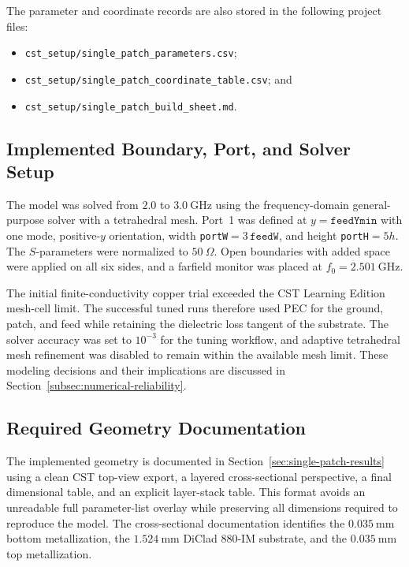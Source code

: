 The parameter and coordinate records are also stored in the following project files:
\begin{itemize}
    \item \nolinkurl{cst_setup/single_patch_parameters.csv};
    \item \nolinkurl{cst_setup/single_patch_coordinate_table.csv}; and
    \item \nolinkurl{cst_setup/single_patch_build_sheet.md}.
\end{itemize}

\subsection{Implemented Boundary, Port, and Solver Setup}
\label{subsec:cst-single-patch-solver-setup}

The model was solved from $2.0$ to $3.0~\mathrm{GHz}$ using the frequency-domain general-purpose
solver with a tetrahedral mesh. Port~1 was defined at $y=\texttt{feedYmin}$ with one mode, positive-$y$
orientation, width \texttt{portW}$=3\,\texttt{feedW}$, and height \texttt{portH}$=5h$. The
$S$-parameters were normalized to $50~\Omega$. Open boundaries with added space were applied on all
six sides, and a farfield monitor was placed at $f_0=2.501~\mathrm{GHz}$.

The initial finite-conductivity copper trial exceeded the CST Learning Edition mesh-cell limit. The
successful tuned runs therefore used PEC for the ground, patch, and feed while retaining the dielectric
loss tangent of the substrate. The solver accuracy was set to $10^{-3}$ for the tuning workflow, and
adaptive tetrahedral mesh refinement was disabled to remain within the available mesh limit. These
modeling decisions and their implications are discussed in Section~\ref{subsec:numerical-reliability}.

\subsection{Required Geometry Documentation}
\label{subsec:required-screenshots-part-i}

The implemented geometry is documented in Section~\ref{sec:single-patch-results} using a clean CST
top-view export, a layered cross-sectional perspective, a final dimensional table, and an explicit layer-stack
table. This format avoids an unreadable full parameter-list overlay while preserving all dimensions required
to reproduce the model. The cross-sectional documentation identifies the $0.035~\mathrm{mm}$ bottom
metallization, the $1.524~\mathrm{mm}$ DiClad 880-IM substrate, and the $0.035~\mathrm{mm}$ top
metallization.
